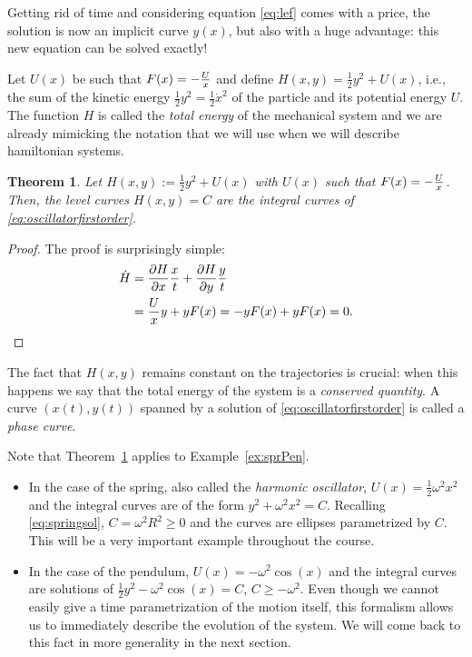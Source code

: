 \documentclass[english,fontsize=11pt,paper=a5,oneside]{scrbook}
\let\d\relax
\newcommand{\d}{\mathrm{d}}
\newtheorem{theorem}{Theorem}[chapter]
\theoremstyle{definition}
\newenvironment{example}
  {\pushQED{\qed}\renewcommand{\qedsymbol}{$\lozenge$}\examplex}
  {\popQED\endexamplex}
\begin{document}
Getting rid of time and considering equation \eqref{eq:lef} comes with a price, the solution is now an implicit curve $y(x)$, but also with a huge advantage: this new equation can be solved exactly!

Let $U(x)$ be such that $F(x) = -\frac{\d U}{\d x}$ and define $H(x, y) = \frac12 y^2 + U(x)$, i.e., the sum of the kinetic energy $\frac12 y^2 = \frac12 {\dot x}^2$ of the particle and its potential energy $U$.
The function $H$ is called the \emph{total energy} of the mechanical system and we are already mimicking the notation that we will use when we will describe hamiltonian systems.

\begin{theorem}\label{thm:ham1}
  Let $H(x, y) := \frac12 y^2 + U(x)$ with $U(x)$ such that $F(x) = -\frac{\d U}{\d x}$.
  Then, the level curves $H(x,y) = C$ are the integral curves of \eqref{eq:oscillatorfirstorder}.
\end{theorem}
\begin{proof}
  The proof is surprisingly simple:
  \begin{align*}
    \dot H & = \frac{\partial H}{\partial x}\frac{\d x}{\d t} + \frac{\partial H}{\partial y}\frac{\d y}{\d t} \\
           & = \frac{\d U}{\d x} y + y F(x)
    = -y F(x) + y F(x) = 0.
  \end{align*}
\end{proof}

The fact that $H(x,y)$ remains constant on the trajectories is crucial: when this happens we say that the total energy of the system is a \emph{conserved quantity}.
A curve $(x(t), y(t))$ spanned by a solution of \eqref{eq:oscillatorfirstorder} is called a \emph{phase curve}.

\begin{example}
  Note that Theorem~\ref{thm:ham1} applies to Example~\ref{ex:sprPen}.
  \begin{itemize}
    \item In the case of the spring, also called the \emph{harmonic oscillator}, $U(x) = \frac12 \omega^2 x^2$ and the integral curves are of the form $y^2 + \omega^2 x^2 = C$.
          Recalling \eqref{eq:springsol}, $C = \omega^2 R^2 \geq 0$ and the curves are ellipses parametrized by $C$.
          This will be a very important example throughout the course.
    \item In the case of the pendulum, $U(x) = -\omega^2 \cos(x)$ and the integral curves are solutions of $\frac12 y^2 - \omega^2 \cos(x) = C$, $C \geq -\omega^2$.
          Even though we cannot easily give a time parametrization of the motion itself, this formalism allows us to immediately describe the evolution of the system.
          We will come back to this fact in more generality in the next section.
  \end{itemize}
\end{example}
\end{document}
